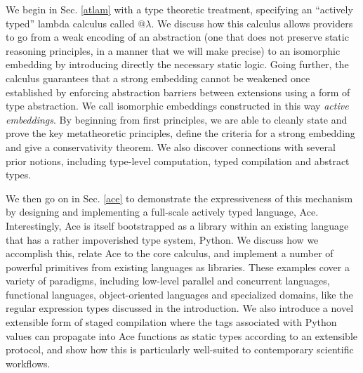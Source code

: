We begin in Sec. \ref{atlam} with a type theoretic treatment, specifying an ``actively typed'' lambda calculus called @$\lambda$. We discuss how this calculus allows providers to go from a weak encoding of an abstraction (one that does not preserve static reasoning principles, in a manner that we will make precise) to an isomorphic embedding by introducing directly the necessary static logic. Going further, the calculus guarantees that a strong embedding cannot be weakened once established by enforcing abstraction barriers between extensions using a form of type abstraction. We call isomorphic embeddings constructed in this way \emph{active embeddings}. By beginning from first principles, we are able to cleanly state and prove the key metatheoretic principles, define the criteria for a strong embedding and give a conservativity theorem. We also discover connections with several prior notions, including type-level computation, typed compilation and abstract types. 

We then go on in Sec. \ref{ace} to demonstrate the expressiveness of this mechanism by designing and implementing a full-scale actively typed language, Ace. Interestingly, Ace is itself bootstrapped as a library within an existing language that has a rather impoverished type system, Python. We discuss how we accomplish this, relate Ace to the core calculus, and implement a number of powerful primitives from existing languages as libraries. These examples cover a variety of paradigms, including low-level parallel and concurrent languages, functional languages, object-oriented languages and specialized domains, like the regular expression types discussed in the introduction. We also introduce a novel extensible form of staged compilation where the tags associated with Python values can propagate into Ace functions as static types according to an extensible protocol, and show how this is particularly well-suited to contemporary scientific workflows.

